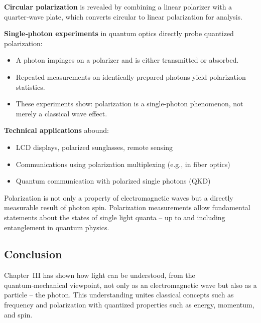 \vspace{0.5em}
\textbf{Circular polarization} is revealed by combining a linear polarizer with a quarter‑wave plate, which converts circular to linear polarization for analysis.

\vspace{0.5em}
\textbf{Single‑photon experiments} in quantum optics directly probe quantized polarization:
\begin{itemize}
	\item A photon impinges on a polarizer and is either transmitted or absorbed.
	\item Repeated measurements on identically prepared photons yield polarization statistics.
	\item These experiments show: polarization is a single‑photon phenomenon, not merely a classical wave effect.
\end{itemize}

\vspace{0.5em}
\textbf{Technical applications} abound:
\begin{itemize}
	\item LCD displays, polarized sunglasses, remote sensing
	\item Communications using polarization multiplexing (e.g., in fiber optics)
	\item Quantum communication with polarized single photons (QKD)
\end{itemize}

\begin{tcolorbox}[physikbox, title=What Polarization Reveals About Photons]
	\label{box:Was uns die}
	Polarization is not only a property of electromagnetic waves but a directly measurable result of photon spin. Polarization measurements allow fundamental statements about the states of single light quanta – up to and including entanglement in quantum physics.
\end{tcolorbox}

\subsection{Conclusion }

Chapter~III has shown how light can be understood, from the quantum‑mechanical viewpoint, not only as an electromagnetic wave but also as a particle – the photon. This understanding unites classical concepts such as frequency and polarization with quantized properties such as energy, momentum, and spin.

